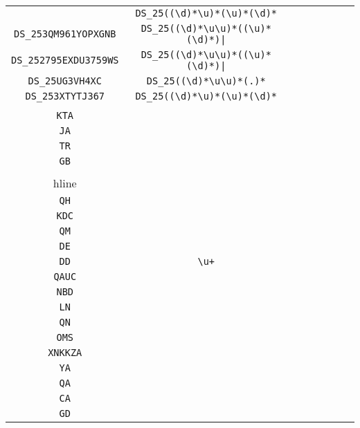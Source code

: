 \begin{longtable}{cccccccc}
\begin{tabular}{ll}
    \verb|DS_25| & \verb|DS_25((\d)*\u)*(\u)*(\d)*|\\
\verb|DS_253QM961YOPXGNB| & \verb.DS_25((\d)*\u\u)*((\u)*(\d)*)|.\\
\verb|DS_252795EXDU3759WS| & \verb.DS_25((\d)*\u\u)*((\u)*(\d)*)|.\\
\verb|DS_25UG3VH4XC| & \verb|DS_25((\d)*\u\u)*(.)*|\\
\verb|DS_253XTYTJ367| & \verb|DS_25((\d)*\u)*(\u)*(\d)*|
\end{tabular}
\\\midrule 
\begin{tabular}{l}
    \verb|Q|\\
\verb|KTA|\\
\verb|JA|\\
\verb|TR|\\
\verb|GB|\\
\\hline\\
\verb|QH|\\
\verb|KDC|\\
\verb|QM|\\
\verb|DE|\\
\verb|DD|
\end{tabular}

&
\verb|\u+|
&

\begin{tabular}{l}
    \verb|(\u)*|\\
\verb|QAUC|\\
\verb|NBD|\\
\verb|LN|\\
\verb|QN|\\
\verb|OMS|
\end{tabular}

&

\begin{tabular}{l}
    \verb.\u((\u)*(\d)*)|((\u)*A).\\
\verb|XNKKZA|\\
\verb|YA|\\
\verb|QA|\\
\verb|CA|\\
\verb|GD|
\end{tabular}

&


\end{longtable}
